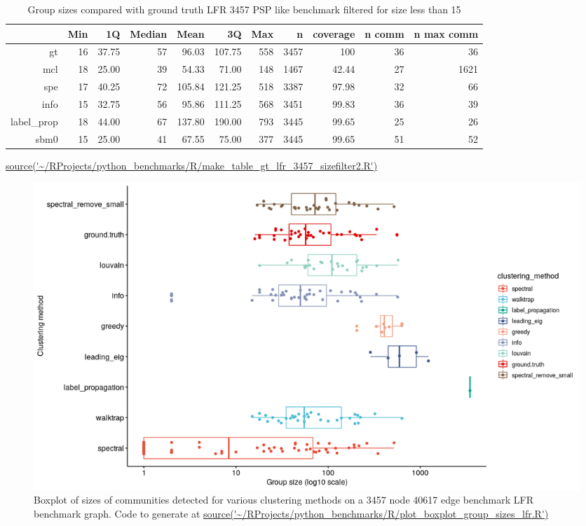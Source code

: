 \begin{table}[ht]
\centering
\begin{adjustbox}{width=\textwidth}

\setlength{\extrarowheight}{2pt}
\begin{tabular}{rrrrrrrrrrr}
  \toprule
  & Min & 1Q & Median & Mean & 3Q & Max & n & coverage & n comm &  n max comm \\ 
  \midrule
  gt & 16 & 37.75 & 57 & 96.03 & 107.75 & 558 & 3457 & 100 & 36 & 36 \\ 
mcl & 18 & 25.00 & 39 & 54.33 & 71.00 & 148 & 1467 & 42.44 & 27 & 1621 \\ 
  spe & 17 & 40.25 & 72 & 105.84 & 121.25 & 518 & 3387 & 97.98 & 32 & 66 \\ 
  info & 15 & 32.75 & 56 & 95.86 & 111.25 & 568 & 3451 & 99.83 & 36 & 39 \\ 
  label\_prop & 18 & 44.00 & 67 & 137.80 & 190.00 & 793 & 3445 & 99.65 & 25 & 26 \\ 
  sbm0 & 15 & 25.00 & 41 & 67.55 & 75.00 & 377 & 3445 & 99.65 & 51 & 52 \\ 
   \bottomrule
\end{tabular}
\end{adjustbox}
\caption{Group sizes compared with ground truth LFR 3457 PSP like benchmark filtered for size less than 15} 
\tiny\url{source('~/RProjects/python_benchmarks/R/make_table_gt_lfr_3457_sizefilter2.R')}
\label{tab:Group sizes compared with ground truth LFR 3457 PSP like benchmark filtered for size less than 15 filter}
\end{table}






  \begin{figure}
      \centering
      \includegraphics[width=\textwidth]{images/Rplot_draft_plot_boxplot_group_sizes_lfr.png}
      \caption{Boxplot of sizes of communities detected for various clustering methods on a 3457 node 40617 edge benchmark LFR benchmark graph. Code to generate at \url{source('~/RProjects/python_benchmarks/R/plot_boxplot_group_sizes_lfr.R')}}
      \label{fig:boxplot group size lfr clustering methods}
  \end{figure}
 
